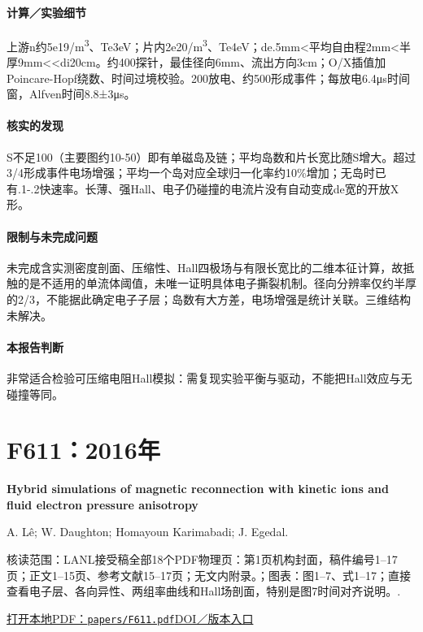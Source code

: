 \documentclass[UTF8,a4paper,11pt,openany,fontset=fandol]{ctexbook}
\begin{document}
\paragraph{计算／实验细节}上游n约5e19/m\textsuperscript{3}、Te3eV；片内2e20/m\textsuperscript{3}、Te4eV；de.5mm<平均自由程2mm<半厚9mm<<di20cm。约400探针，最佳径向6mm、流出方向3cm；O/X插值加Poincare-Hopf绕数、时间过境校验。200放电、约500形成事件；每放电6.4μs时间窗，Alfven时间8.8±3μs。

\paragraph{核实的发现}S不足100（主要图约10-50）即有单磁岛及链；平均岛数和片长宽比随S增大。超过3/4形成事件电场增强；平均一个岛对应全球归一化率约10\%增加；无岛时已有.1-.2快速率。长薄、强Hall、电子仍碰撞的电流片没有自动变成de宽的开放X形。

\paragraph{限制与未完成问题}未完成含实测密度剖面、压缩性、Hall四极场与有限长宽比的二维本征计算，故抵触的是不适用的单流体阈值，未唯一证明具体电子撕裂机制。径向分辨率仅约半厚的2/3，不能据此确定电子子层；岛数有大方差，电场增强是统计关联。三维结构未解决。

\paragraph{本报告判断}非常适合检验可压缩电阻Hall模拟：需复现实验平衡与驱动，不能把Hall效应与无碰撞等同。

\section{F611：2016年}\label{paper:F611}

\textbf{Hybrid simulations of magnetic reconnection with kinetic ions and fluid electron pressure anisotropy}\citep{F611}\

A. Lê;  W. Daughton;  Homayoun Karimabadi;  J. Egedal.

\textsf{核读范围：}LANL接受稿全部18个PDF物理页：第1页机构封面，稿件编号1–17页；正文1–15页、参考文献15–17页；无文内附录。；\textsf{图表：}图1–7、式1–17；直接查看电子层、各向异性、两组率曲线和Hall场剖面，特别是图7时间对齐说明。.

\href{run:../papers/F611.pdf}{打开本地PDF：\texttt{papers/F611.pdf}}\quad\href{https://doi.org/10.1063/1.4943893}{DOI／版本入口}
\end{document}
